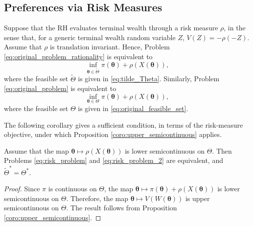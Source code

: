 \documentclass[a4paper,12pt]{article}
\begin{document}
\subsection{Preferences via Risk Measures}
Suppose that the RH evaluates terminal wealth through a risk measure $\rho$, in the sense that, for a generic terminal wealth random variable $Z$, $V\left(Z\right)=-\rho\left(-Z\right)$. Assume that $\rho$ is translation invariant. Hence, Problem \eqref{eq:original_problem_rationality} is equivalent to
\begin{equation}
\inf_{{\bm\theta}\in\tilde{\Theta}}\pi\left({\bm\theta}\right)+\rho\left(X\left({\bm\theta}\right)\right),
\label{eq:risk_problem}
\end{equation}
where the feasible set $\tilde{\Theta}$ is given in \eqref{eq:tilde_Theta}. Similarly, Problem \eqref{eq:original_problem} is equivalent to
\begin{equation}
\inf_{{\bm\theta}\in\Theta}\pi\left({\bm\theta}\right)+\rho\left(X\left({\bm\theta}\right)\right),
\label{eq:risk_problem_2}
\end{equation}
where the feasible set $\Theta$ is given in \eqref{eq:original_feasible_set}.

The following corollary gives a sufficient condition, in terms of the risk-measure objective, under which Proposition \ref{coro:upper_semicontinuous} applies.
\begin{corollary}\label{coro:lower_semicontinuous}
Assume that the map ${\bm\theta}\mapsto \rho\left(X\left({\bm\theta}\right)\right)$ is lower semicontinuous on $\Theta$. Then Problems \eqref{eq:risk_problem} and \eqref{eq:risk_problem_2} are equivalent, and $\tilde{\Theta}^*=\Theta^*$.
\end{corollary}
\begin{proof}
Since $\pi$ is continuous on $\Theta$, the map ${\bm\theta}\mapsto \pi\left({\bm\theta}\right)+\rho\left(X\left({\bm\theta}\right)\right)$ is lower semicontinuous on $\Theta$. Therefore, the map ${\bm\theta}\mapsto V\left(W\left({\bm\theta}\right)\right)$ is upper semicontinuous on $\Theta$. The result follows from Proposition \ref{coro:upper_semicontinuous}.
\end{proof}
\end{document}
